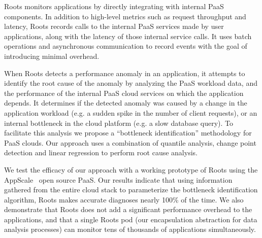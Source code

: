 Roots monitors applications by directly integrating with internal PaaS components.
In addition to high-level metrics such as request throughput
and latency, Roots records calls to the internal PaaS services made by user applications,
along with the latency of those internal service calls. It uses batch operations and asynchronous 
communication to record events with the goal of introducing minimal overhead.

When Roots detects a performance anomaly in an application, it attempts to
identify the root cause of the anomaly by analyzing the PaaS workload data,
and the performance of the internal PaaS cloud services on which the application depends.
It determines if the detected anomaly was caused by a change in the
application workload (e.g. a sudden spike in the number of client requests), or an internal
bottleneck in the cloud platform (e.g. a slow database query). To facilitate
this analysis we propose a ``bottleneck identification'' methodology
for PaaS clouds. 
Our approach uses a combination of quantile analysis, change point detection
and linear regression to perform root cause analysis. 

We test the efficacy of our approach with a working prototype of 
Roots using the AppScale~\cite{6488671} open source PaaS. 
Our results indicate that using information gathered from the entire cloud
stack to parameterize the bottleneck identification algorithm, Roots
makes accurate diagnoses nearly 100\% of the time. 
We also demonstrate that Roots does not add a significant performance overhead
to the applications, and that a single Roots pod (our encapsulation abstraction for
data analysis processes) can monitor tens of thousands
of applications simultaneously.

